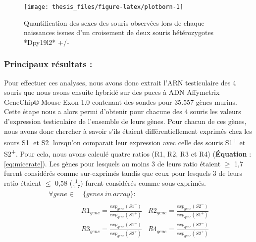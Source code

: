 \documentclass[12pt,twoside]{reedthesis}
\begin{document}
  \newpage
  
  \begin{figure}
  
  {\centering \texttt{[image: thesis\_files/figure-latex/plotborn-1]} 
  
  }
  
  \caption[Quantification des sexes des souris observées lors de chaque naissances issues d'un croisement de deux souris hétérozygotes *Dpy19l2* +/-]{Quantification des sexes des souris observées lors de chaque naissances issues d'un croisement de deux souris hétérozygotes *Dpy19l2* +/-}\label{fig:plotborn}
  \end{figure}
  
  \newpage
  
  
  
  \newpage
  
  \subsubsection{Principaux résultats :}\label{principaux-resultats-1}
  
  Pour effectuer ces analyses, nous avons donc extrait l'ARN testiculaire
  des 4 souris que nous avons ensuite hybridé sur des puces à ADN
  Affymetrix GeneChip® Mouse Exon 1.0 contenant des sondes pour 35.557
  gènes murins. Cette étape nous a alors permi d'obtenir pour chacune des
  4 souris les valeurs d'expression testiculaire de l'ensemble de leurs
  gènes. Pour chacun de ces gènes, nous avons donc chercher à savoir s'ils
  étaient différentiellement exprimés chez les sours S1\textsuperscript{-}
  et S2\textsuperscript{-} lorsqu'on comparait leur expression avec celle
  des souris S1\textsuperscript{+} et S2\textsuperscript{+}. Pour cela,
  nous avons calculé quatre ratios (R1, R2, R3 et R4) (\textbf{Équation} :
  \eqref{eq:micerate}). Les gènes pour lesquels au moins 3 de leurs ratio
  étaient \(\ge\) 1,7 furent considérés comme sur-exprimés tandis que ceux
  pour lesquels 3 de leurs ratio étaient \(\le\) 0,58 (\(\frac{1}{1,7}\))
  furent considérés comme sous-exprimés.\\
  
  \begin{equation} 
  \begin{split}
  \forall gene \in & \ \{genes\ in\ array\}: \\
  \\
  & R1_{gene} = \frac{exp_{gene}(S1^-)}{exp_{gene}(S1^+)} \ \ \ \ R2_{gene} = \frac{exp_{gene}(S2^-)}{exp_{gene}(S1^+)} \\
  & R3_{gene} = \frac{exp_{gene}(S1^-)}{exp_{gene}(S2^+)} \ \ \ \ R4_{gene} = \frac{exp_{gene}(S2^-)}{exp_{gene}(S2^+)} 
  \label{eq:micerate}
  \end{split}
  \end{equation}
  
\end{document}
